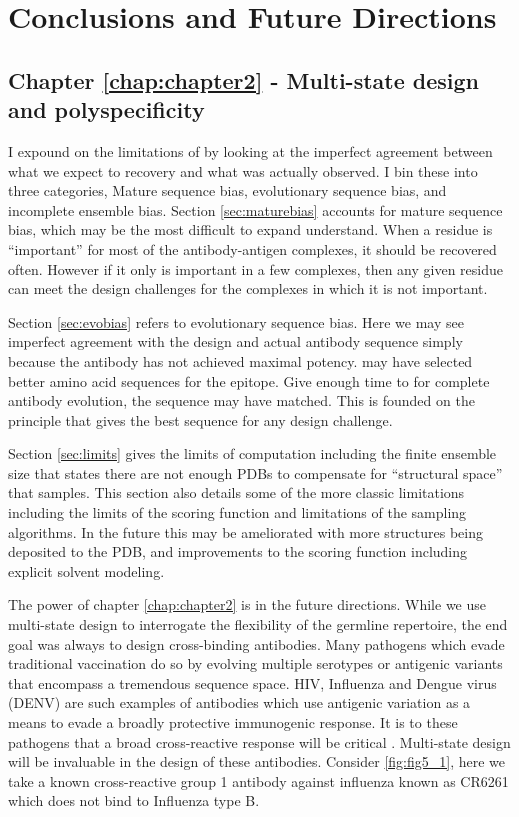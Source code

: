 \chapter{Conclusions and Future Directions}
\label{chap:chapter5}
\section{Chapter \ref{chap:chapter2} - Multi-state design and polyspecificity}
I expound on the limitations of \rosettadesign by looking at the imperfect agreement between what we expect \rosettadesign to recovery and what was actually observed. I bin these into three categories, Mature sequence bias, evolutionary sequence bias, and incomplete ensemble bias. Section \ref{sec:maturebias} accounts for mature sequence bias, which may be the most difficult to expand understand. When a residue is ``important'' for most of the antibody-antigen complexes, it should be recovered often. However if it only is important in a few complexes, then any given residue can meet the design challenges for the complexes in which it is not important.

Section \ref{sec:evobias} refers to evolutionary sequence bias. Here we may see imperfect agreement with the design and actual antibody sequence simply because the antibody has not achieved maximal potency. \rosettadesign may have selected better amino acid sequences for the epitope. Give enough time to for complete antibody evolution, the sequence may have matched. This is founded on the principle that \rosettadesign gives the best sequence for any design challenge.

Section \ref{sec:limits} gives the limits of computation including the finite ensemble size that states there are not enough PDBs to compensate for ``structural space'' that \rosettadesign samples. This section also details some of the more classic limitations including the limits of the \rosetta scoring function and limitations of the sampling algorithms. In the future this may be ameliorated with more structures being deposited to the PDB, and improvements to the scoring function including explicit solvent modeling.

The power of chapter \ref{chap:chapter2} is in the future directions. While we use multi-state design to interrogate the flexibility of the germline repertoire, the end goal was always to design cross-binding antibodies. Many pathogens which evade traditional vaccination do so by evolving multiple serotypes or antigenic variants that encompass a tremendous sequence space. HIV, Influenza and Dengue virus (DENV) are such examples of antibodies which use antigenic variation as a means to evade a broadly protective immunogenic response. It is to these pathogens that a broad cross-reactive response will be critical \citep{Corti:2013ex,Lanzavecchia:2009dd,Corti:2011ku,Simonelli:2013jc}. Multi-state design will be invaluable in the design of these antibodies. Consider \ref{fig:fig5_1}, here we take a known cross-reactive group 1 antibody against influenza known as CR6261 \citep{Throsby:2008dc} which does not bind to Influenza type B.

